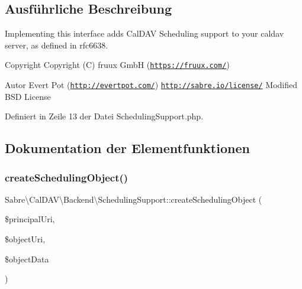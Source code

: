 \subsection{Ausführliche Beschreibung}
Implementing this interface adds Cal\+D\+AV Scheduling support to your caldav server, as defined in rfc6638.

\begin{DoxyCopyright}{Copyright}
Copyright (C) fruux GmbH (\href{https://fruux.com/}{\tt https\+://fruux.\+com/}) 
\end{DoxyCopyright}
\begin{DoxyAuthor}{Autor}
Evert Pot (\href{http://evertpot.com/}{\tt http\+://evertpot.\+com/})  \href{http://sabre.io/license/}{\tt http\+://sabre.\+io/license/} Modified B\+SD License 
\end{DoxyAuthor}


Definiert in Zeile 13 der Datei Scheduling\+Support.\+php.



\subsection{Dokumentation der Elementfunktionen}
\mbox{\label{interface_sabre_1_1_cal_d_a_v_1_1_backend_1_1_scheduling_support_a35f6df6ce36abacd013a5f0a26b3ae8d}} 
\subsubsection{\texorpdfstring{create\+Scheduling\+Object()}{createSchedulingObject()}}
{\footnotesize\ttfamily Sabre\textbackslash{}\+Cal\+D\+A\+V\textbackslash{}\+Backend\textbackslash{}\+Scheduling\+Support\+::create\+Scheduling\+Object (\begin{DoxyParamCaption}\item[{}]{\$principal\+Uri,  }\item[{}]{\$object\+Uri,  }\item[{}]{\$object\+Data }\end{DoxyParamCaption})}

